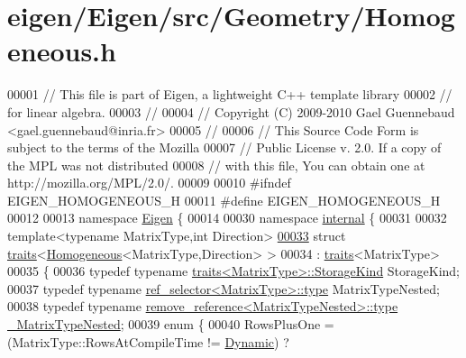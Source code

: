 \hypertarget{eigen_2_eigen_2src_2_geometry_2_homogeneous_8h_source}{}\section{eigen/\+Eigen/src/\+Geometry/\+Homogeneous.h}
\label{eigen_2_eigen_2src_2_geometry_2_homogeneous_8h_source}

\begin{DoxyCode}
00001 \textcolor{comment}{// This file is part of Eigen, a lightweight C++ template library}
00002 \textcolor{comment}{// for linear algebra.}
00003 \textcolor{comment}{//}
00004 \textcolor{comment}{// Copyright (C) 2009-2010 Gael Guennebaud <gael.guennebaud@inria.fr>}
00005 \textcolor{comment}{//}
00006 \textcolor{comment}{// This Source Code Form is subject to the terms of the Mozilla}
00007 \textcolor{comment}{// Public License v. 2.0. If a copy of the MPL was not distributed}
00008 \textcolor{comment}{// with this file, You can obtain one at http://mozilla.org/MPL/2.0/.}
00009 
00010 \textcolor{preprocessor}{#ifndef EIGEN\_HOMOGENEOUS\_H}
00011 \textcolor{preprocessor}{#define EIGEN\_HOMOGENEOUS\_H}
00012 
00013 \textcolor{keyword}{namespace }\hyperlink{namespace_eigen}{Eigen} \{ 
00014 
00030 \textcolor{keyword}{namespace }\hyperlink{namespaceinternal}{internal} \{
00031 
00032 \textcolor{keyword}{template}<\textcolor{keyword}{typename} MatrixType,\textcolor{keywordtype}{int} Direction>
\hyperlink{struct_eigen_1_1internal_1_1traits_3_01_homogeneous_3_01_matrix_type_00_01_direction_01_4_01_4}{00033} \textcolor{keyword}{struct }\hyperlink{struct_eigen_1_1internal_1_1traits}{traits}<\hyperlink{group___geometry___module_class_eigen_1_1_homogeneous}{Homogeneous}<MatrixType,Direction> >
00034  : \hyperlink{struct_eigen_1_1internal_1_1traits}{traits}<MatrixType>
00035 \{
00036   \textcolor{keyword}{typedef} \textcolor{keyword}{typename} \hyperlink{struct_eigen_1_1internal_1_1traits}{traits<MatrixType>::StorageKind} StorageKind;
00037   \textcolor{keyword}{typedef} \textcolor{keyword}{typename} \hyperlink{struct_eigen_1_1internal_1_1ref__selector}{ref\_selector<MatrixType>::type} MatrixTypeNested;
00038   \textcolor{keyword}{typedef} \textcolor{keyword}{typename} \hyperlink{group___sparse_core___module}{remove\_reference<MatrixTypeNested>::type} 
      \hyperlink{group___sparse_core___module}{\_MatrixTypeNested};
00039   \textcolor{keyword}{enum} \{
00040     RowsPlusOne = (MatrixType::RowsAtCompileTime != \hyperlink{namespace_eigen_ad81fa7195215a0ce30017dfac309f0b2}{Dynamic}) ?

\end{DoxyCode}
